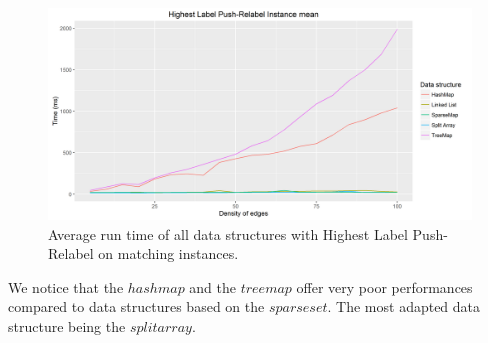 \begin{figure}[H]
\begin{center}
\includegraphics[scale=0.5]{images/prmeanmatching.png}
\caption{Average run time of all data structures with Highest Label Push-Relabel on matching instances.}
\label{fig:prmeanmatching}
\end{center}
\end{figure}
We notice that the $hashmap$ and the $treemap$ offer very poor performances compared to data structures based on the $sparseset$. The most adapted data structure being the $split array$.

